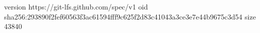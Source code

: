 version https://git-lfs.github.com/spec/v1
oid sha256:293890f2fef60563f3ac61594fff9c625f2d83c41043a3ce3e7e44b9675c3d54
size 43840

